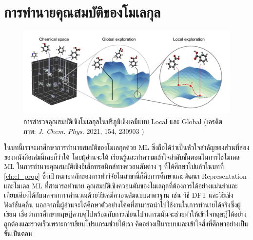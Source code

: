 

\chapter{การทำนายคุณสมบัติของโมเลกุล}
\label{ch:predict_molprop}

\begin{figure}[htbp]
    \centering
    \includegraphics[width=\linewidth]{fig/ml_pred_chem.png}
    \caption{การสำรวจคุณสมบัติเชิงโมเลกุลในปริภูมิเชิงเคมีแบบ Local และ Global 
    (เครดิตภาพ: \textit{J. Chem. Phys.} 2021, 154, 230903 \autocite{westermayr2021b})}
    \label{fig:ml_pred_chem}
\end{figure}

ในบทนี้เราจะมาศึกษาการทำนายสมบัติของโมเลกุลด้วย ML ซึ่งถือได้ว่าเป็นหัวใจสำคัญของส่วนที่สองของหนังสือเล่มนี้เลยก็ว่าได้ โดยผู้อ่านจะได้%
เรียนรู้และทำความเข้าใจลำดับขั้นตอนในการใช้โมเดล ML ในการทำนายคุณสมบัติเชิงอิเล็กทรอนิกส์ทางควอนตัมต่าง ๆ ที่ได้ศึกษาไปแล้วในบทที่ 
\ref{ch:el_prop} ซึ่งเป้าหมายหลักของการทำวิจัยในสาขานี้ก็คือการศึกษาและพัฒนา Representation และโมเดล ML ที่สามารถทำนาย%
คุณสมบัติเชิงควอนตัมของโมเลกุลที่ต้องการได้อย่างแม่นยำและเทียบเคียงได้กับผลจากการคำนวณด้วยวิธีเคมีควอนตัมแบบมาตรฐาน เช่น วิธี DFT 
และวิธีเชิงฟังก์ชันคลื่น\autocite{ceriotti2018} นอกจากนี้ผู้อ่านจะได้ศึกษาตัวอย่างโค้ดที่สามารถนำไปใช้งานในการทำนายได้จริงซึ่งผู้เขียน%
เชื่อว่าการศึกษาทฤษฎีควบคู่ไปพร้อมกับการเขียนโปรแกรมนั้นจะช่วยทำให้เข้าใจทฤษฎีได้อย่างถูกต้องและรวดเร็วเพราะการเขียนโปรแกรมช่วยให้เรา%
คิดอย่างเป็นระบบและเข้าใจสิ่งที่ศึกษาอย่างเป็นขั้นเป็นตอน

